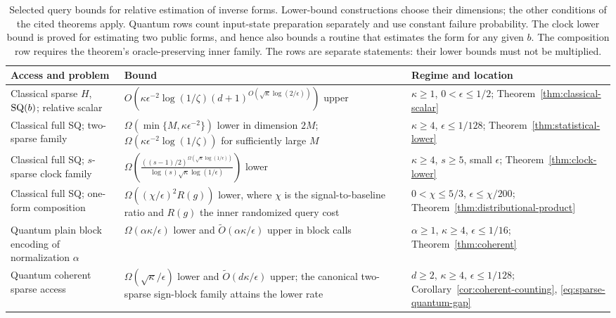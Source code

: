 \begin{table}[!htbp]
\centering
\small
\renewcommand{\arraystretch}{1.18}
\begin{tabular}{@{}>{\raggedright\arraybackslash}p{}>{\raggedright\arraybackslash}p{}>{\raggedright\arraybackslash}p{}@{}}
\toprule
Access and problem & Bound & Regime and location\\
\midrule
Classical sparse $H$, $\mathrm{SQ}(b)$; relative scalar &
$O(\kappa\epsilon^{-2}\log(1/\zeta)
(d+1)^{O(\sqrt\kappa\log(2/\epsilon))})$ upper &
$\kappa\geq1$, $0<\epsilon\leq1/2$;
Theorem~\ref{thm:classical-scalar}\\
Classical full SQ; two-sparse family &
$\Omega(\min\{M,\kappa\epsilon^{-2}\})$ lower in dimension $2M$;
$\Omega(\kappa\epsilon^{-2}\log(1/\zeta))$ for sufficiently large $M$ &
$\kappa\geq4$, $\epsilon\leq1/128$;
Theorem~\ref{thm:statistical-lower}\\
Classical full SQ; $s$-sparse clock family &
$\displaystyle\Omega\!\left(
\frac{((s-1)/2)^{\Omega(\sqrt\kappa\log(1/\epsilon))}}
{\log(s)\sqrt\kappa\log(1/\epsilon)}\right)$ lower &
$\kappa\geq4$, $s\geq5$, small $\epsilon$;
Theorem~\ref{thm:clock-lower}\\
Classical full SQ; one-form composition &
$\Omega((\chi/\epsilon)^2R(g))$ lower, where $\chi$ is the signal-to-baseline
ratio and $R(g)$ the inner randomized query cost &
$0<\chi\leq5/3$, $\epsilon\leq\chi/200$;
Theorem~\ref{thm:distributional-product}\\
Quantum plain block encoding of normalization $\alpha$ &
$\Omega(\alpha\kappa/\epsilon)$ lower and
$\widetilde O(\alpha\kappa/\epsilon)$ upper in block calls &
$\alpha\geq1$, $\kappa\geq4$, $\epsilon\leq1/16$;
Theorem~\ref{thm:coherent}\\
Quantum coherent sparse access &
$\Omega(\sqrt\kappa/\epsilon)$ lower and
$\widetilde O(d\kappa/\epsilon)$ upper;
the canonical two-sparse sign-block family attains the lower rate &
$d\geq2$, $\kappa\geq4$, $\epsilon\leq1/128$;
Corollary~\ref{cor:coherent-counting},
\eqref{eq:sparse-quantum-gap}\\
\bottomrule
\end{tabular}
\caption{Selected query bounds for relative estimation of inverse
forms. Lower-bound constructions choose their dimensions; the other
conditions of the cited theorems apply. Quantum
rows count input-state preparation separately and use constant failure
probability. The clock lower bound is proved for estimating two public
forms, and hence also bounds a routine that estimates the form for any
given $b$. The composition row requires the theorem's oracle-preserving
inner family. The rows are separate statements: their lower
bounds must not be multiplied.}
\label{tab:rates}
\end{table}

